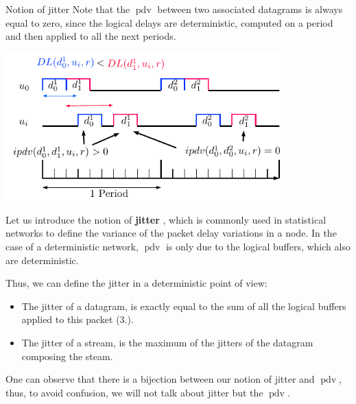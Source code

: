 \documentclass[10pt]{article}
\DeclareMathOperator{\pdv}{pdv}
\begin{document}
\begin{subsubsection}{Notion of jitter}
Note that the $\pdv$ between two associated datagrams is always equal to zero, since the logical delays are deterministic, computed on a period and then applied to all the next periods.

\begin{center}
\includegraphics[width=0.8\textwidth]{ipdv}
  \end{center}
  
Let us introduce the notion of {\bf jitter} \cite{guillemin_peak_1992} , which is commonly used in statistical networks to define the variance of the packet delay variations in a node. In the case of a deterministic network, $\pdv$ is only due to the logical buffers, which also are deterministic. 

Thus, we can define the jitter in a deterministic point of view:
\begin{itemize}
\item The jitter of a datagram, is exactly equal to the sum of all the logical buffers applied to this packet (3.).
\item The jitter of a stream, is the maximum of the jitters of the datagram composing the steam.
\end{itemize}

One can observe that there is a bijection between our notion of jitter and $\pdv$, thus, to avoid confusion, we will not talk about jitter but the $\pdv$. 

  \end{subsubsection}
\end{document}
